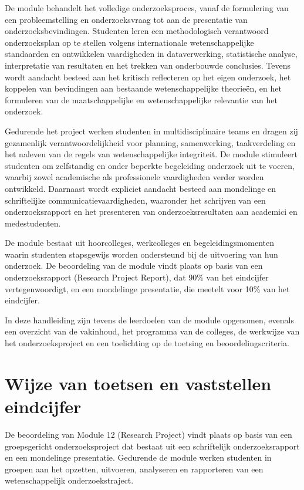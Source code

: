\documentclass[
  letterpaper,
  DIV=11,
  numbers=noendperiod]{scrreprt}
\begin{document}
De module behandelt het volledige onderzoeksproces, vanaf de formulering
van een probleemstelling en onderzoeksvraag tot aan de presentatie van
onderzoeksbevindingen. Studenten leren een methodologisch verantwoord
onderzoeksplan op te stellen volgens internationale wetenschappelijke
standaarden en ontwikkelen vaardigheden in dataverwerking, statistische
analyse, interpretatie van resultaten en het trekken van onderbouwde
conclusies. Tevens wordt aandacht besteed aan het kritisch reflecteren
op het eigen onderzoek, het koppelen van bevindingen aan bestaande
wetenschappelijke theorieën, en het formuleren van de maatschappelijke
en wetenschappelijke relevantie van het onderzoek.

Gedurende het project werken studenten in multidisciplinaire teams en
dragen zij gezamenlijk verantwoordelijkheid voor planning, samenwerking,
taakverdeling en het naleven van de regels van wetenschappelijke
integriteit. De module stimuleert studenten om zelfstandig en onder
beperkte begeleiding onderzoek uit te voeren, waarbij zowel academische
als professionele vaardigheden verder worden ontwikkeld. Daarnaast wordt
expliciet aandacht besteed aan mondelinge en schriftelijke
communicatievaardigheden, waaronder het schrijven van een
onderzoeksrapport en het presenteren van onderzoeksresultaten aan
academici en medestudenten.

De module bestaat uit hoorcolleges, werkcolleges en begeleidingsmomenten
waarin studenten stapsgewijs worden ondersteund bij de uitvoering van
hun onderzoek. De beoordeling van de module vindt plaats op basis van
een onderzoeksrapport (Research Project Report), dat 90\% van het
eindcijfer vertegenwoordigt, en een mondelinge presentatie, die meetelt
voor 10\% van het eindcijfer.

In deze handleiding zijn tevens de leerdoelen van de module opgenomen,
evenals een overzicht van de vakinhoud, het programma van de colleges,
de werkwijze van het onderzoeksproject en een toelichting op de toetsing
en beoordelingscriteria.

\section*{Wijze van toetsen en vaststellen
eindcijfer}\label{wijze-van-toetsen-en-vaststellen-eindcijfer}


De beoordeling van Module 12 (Research Project) vindt plaats op basis
van een groepsgericht onderzoeksproject dat bestaat uit een schriftelijk
onderzoeksrapport en een mondelinge presentatie. Gedurende de module
werken studenten in groepen aan het opzetten, uitvoeren, analyseren en
rapporteren van een wetenschappelijk onderzoekstraject.
\end{document}

